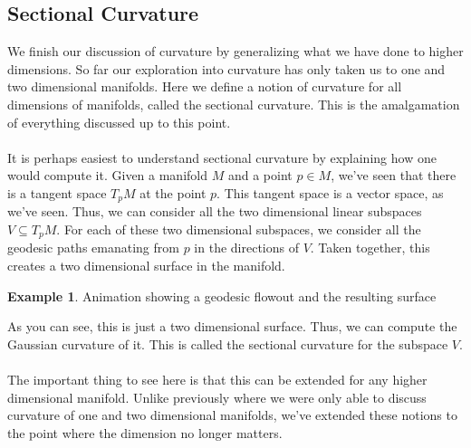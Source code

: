 \documentclass[]{article}
\newcommand\<{\ensuremath{\left\langle}}
\renewcommand\>{\ensuremath{\right\rangle}}
\theoremstyle{definition}
\theoremstyle{definition}
\newtheorem{example}{Example}[section]
\begin{document}
	\subsection*{Sectional Curvature}
	We finish our discussion of curvature by generalizing what we have done to higher dimensions. So far our exploration into curvature has only taken us to one and two dimensional manifolds. Here we define a notion of curvature for all dimensions of manifolds, called the sectional curvature. This is the amalgamation of everything discussed up to this point.\\
	\\
	It is perhaps easiest to understand sectional curvature by explaining how one would compute it. Given a manifold $M$ and a point $p \in M$, we've seen that there is a tangent space $T_pM$ at the point $p$. This tangent space is a vector space, as we've seen. Thus, we can consider all the two dimensional linear subspaces $V \subseteq T_pM$. For each of these two dimensional subspaces, we consider all the geodesic paths emanating from $p$ in the directions of $V$. Taken together, this creates a two dimensional surface in the manifold.
	\begin{example}
		Animation showing a geodesic flowout and the resulting surface
	\end{example}
	As you can see, this is just a two dimensional surface. Thus, we can compute the Gaussian curvature of it. This is called the sectional curvature for the subspace $V$.\\
	\\
	The important thing to see here is that this can be extended for any higher dimensional manifold. Unlike previously where we were only able to discuss curvature of one and two dimensional manifolds, we've extended these notions to the point where the dimension no longer matters.
\end{document}
